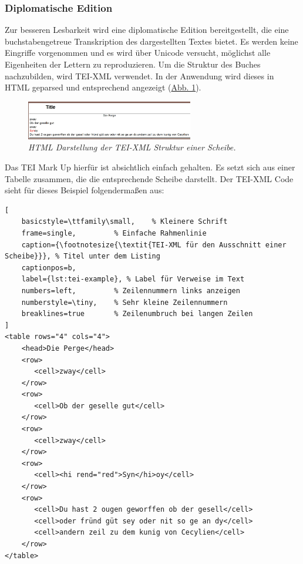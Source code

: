 \documentclass[12pt,a4paper]{article}
\begin{document}
		\subsubsection{Diplomatische Edition}
			Zur besseren Lesbarkeit wird eine diplomatische Edition bereitgestellt, die eine buchstabengetreue 
			Transkription des dargestellten Textes bietet. Es werden keine Eingriffe vorgenommen und es wird über 
			Unicode versucht, möglichst alle Eigenheiten der Lettern zu reproduzieren. Um die Struktur des Buches nachzubilden, 
			wird TEI-XML verwendet. In der Anwendung wird dieses in HTML geparsed und entsprechend angezeigt (\hyperref[Abbildung1]{Abb. 1}).
			\vspace{5pt}
			\begin{figure}[h]
				\label{Abbildung1}
				\centering
				\includegraphics[width=0.65\textwidth]{abb-1-tei-parsed.JPG}
				\caption{\footnotesize{\textit{HTML Darstellung der TEI-XML Struktur einer Scheibe.}}}
				
			\end{figure}
			Das TEI Mark Up hierfür ist absichtlich einfach gehalten. Es setzt sich aus einer Tabelle zusammen, die die entsprechende
			Scheibe darstellt. Der TEI-XML Code sieht für dieses Beispiel folgendermaßen aus:
\begin{lstlisting}[
    basicstyle=\ttfamily\small,    % Kleinere Schrift
    frame=single,         % Einfache Rahmenlinie
    caption={\footnotesize{\textit{TEI-XML für den Ausschnitt einer Scheibe}}}, % Titel unter dem Listing
	captionpos=b,
    label={lst:tei-example}, % Label für Verweise im Text
    numbers=left,         % Zeilennummern links anzeigen
    numberstyle=\tiny,    % Sehr kleine Zeilennummern
    breaklines=true       % Zeilenumbruch bei langen Zeilen
]
<table rows="4" cols="4">
	<head>Die Perge</head>
	<row>
	   <cell>zway</cell>
	</row>
	<row>
	   <cell>Ob der geselle gut</cell>
	</row>
	<row>
	   <cell>zway</cell>
	</row>
	<row>
	   <cell><hi rend="red">Syn</hi>oy</cell>
	</row>
	<row>
	   <cell>Du hast 2 ougen geworffen ob der gesell</cell>
	   <cell>oder fründ güt sey oder nit so ge an dy</cell>
	   <cell>andern zeil zu dem kunig von Cecylien</cell>
	</row>
</table>
\end{lstlisting}
	
\end{document}
